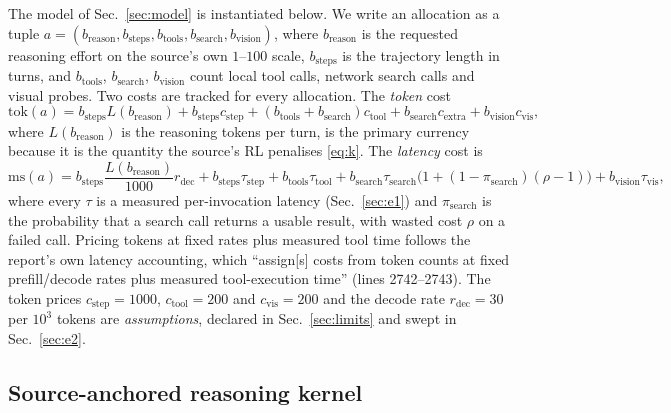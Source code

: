 \documentclass[10pt]{article} %
\newcommand{\eff}{b}
\newcommand{\reff}{\eff_{\mathrm{reason}}}
\newcommand{\stepeff}{\eff_{\mathrm{steps}}}
\newcommand{\tooleff}{\eff_{\mathrm{tools}}}
\newcommand{\searcheff}{\eff_{\mathrm{search}}}
\newcommand{\viseff}{\eff_{\mathrm{vision}}}
\begin{document}
The model of Sec.~\ref{sec:model} is instantiated below. We write an allocation as a tuple
$a = (\reff, \stepeff, \tooleff, \searcheff, \viseff)$, where $\reff$ is the requested reasoning
effort on the source's own $1$--$100$ scale, $\stepeff$ is the trajectory length in
turns, and $\tooleff$, $\searcheff$, $\viseff$ count local tool calls, network search calls and
visual probes. Two costs are tracked for every allocation. The \emph{token} cost
\begin{equation}
\mathrm{tok}(a) = \stepeff L(\reff)
  + \stepeff c_{\mathrm{step}}
  + (\tooleff + \searcheff) c_{\mathrm{tool}}
  + \searcheff c_{\mathrm{extra}}
  + \viseff c_{\mathrm{vis}},
\end{equation}
where $L(\reff)$ is the reasoning tokens per turn, is the primary currency
because it is the quantity the source's RL penalises \eqref{eq:k}. The
\emph{latency} cost is
\begin{equation}
\mathrm{ms}(a) = \stepeff \frac{L(\reff)}{1000} r_{\mathrm{dec}}
  + \stepeff \tau_{\mathrm{step}}
  + \tooleff \tau_{\mathrm{tool}}
  + \searcheff \tau_{\mathrm{search}} \big(1 + (1-\pi_{\mathrm{search}})(\rho-1)\big)
  + \viseff \tau_{\mathrm{vis}},
\end{equation}
where every $\tau$ is a measured per-invocation latency (Sec.~\ref{sec:e1}) and
$\pi_{\mathrm{search}}$ is the probability that a search call returns a usable
result, with wasted cost $\rho$ on a failed call. Pricing tokens at fixed rates
plus measured tool time follows the report's own latency accounting, which
``assign[s] costs from token counts at fixed prefill/decode rates plus measured
tool-execution time'' (lines 2742--2743). The token prices
$c_{\mathrm{step}}=1000$, $c_{\mathrm{tool}}=200$ and $c_{\mathrm{vis}}=200$
and the decode rate $r_{\mathrm{dec}}=30$ per $10^3$ tokens are
\emph{assumptions}, declared in Sec.~\ref{sec:limits} and swept in
Sec.~\ref{sec:e2}.

\subsection{Source-anchored reasoning kernel}
\label{sec:kernel}
\end{document}
